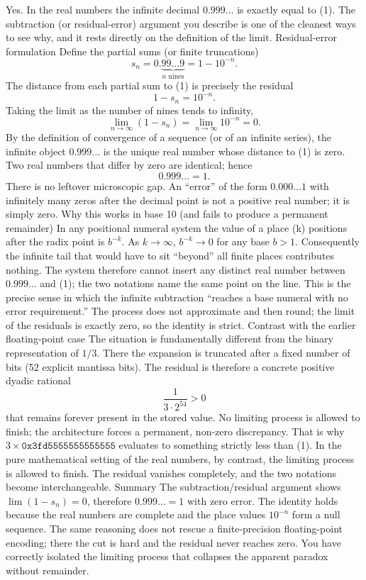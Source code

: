 Yes. In the real numbers the infinite decimal \(0.999\ldots\) is exactly equal to (1). The subtraction (or residual-error) argument you describe is one of the cleanest ways to see why, and it rests directly on the definition of the limit.
Residual-error formulation
Define the partial sums (or finite truncations)
\[
s_n = 0.\underbrace{99\ldots9}_{n\text{ nines}} = 1 - 10^{-n}.
\]
The distance from each partial sum to (1) is precisely the residual
\[
1 - s_n = 10^{-n}.
\]
Taking the limit as the number of nines tends to infinity,
\[
\lim_{n\to\infty}(1 - s_n) = \lim_{n\to\infty}10^{-n} = 0.
\]
By the definition of convergence of a sequence (or of an infinite series), the infinite object \(0.999\ldots\) is the unique real number whose distance to (1) is zero. Two real numbers that differ by zero are identical; hence
\[
0.999\ldots = 1.
\]
There is no leftover microscopic gap. An “error” of the form \(0.000\ldots1\) with infinitely many zeros after the decimal point is not a positive real number; it is simply zero.
Why this works in base 10 (and fails to produce a permanent remainder)
In any positional numeral system the value of a place (k) positions after the radix point is \(b^{-k}\). As \(k\to\infty\), \(b^{-k}\to 0\) for any base \(b>1\). Consequently the infinite tail that would have to sit “beyond” all finite places contributes nothing. The system therefore cannot insert any distinct real number between \(0.999\ldots\) and (1); the two notations name the same point on the line.
This is the precise sense in which the infinite subtraction “reaches a base numeral with no error requirement.” The process does not approximate and then round; the limit of the residuals is exactly zero, so the identity is strict.
Contrast with the earlier floating-point case
The situation is fundamentally different from the binary representation of \(1/3\). There the expansion is truncated after a fixed number of bits (52 explicit mantissa bits). The residual is therefore a concrete positive dyadic rational
\[
\frac{1}{3\cdot 2^{54}} > 0
\]
that remains forever present in the stored value. No limiting process is allowed to finish; the architecture forces a permanent, non-zero discrepancy. That is why \(3\times\texttt{0x3fd5555555555555}\) evaluates to something strictly less than (1).
In the pure mathematical setting of the real numbers, by contrast, the limiting process is allowed to finish. The residual vanishes completely, and the two notations become interchangeable.
Summary
The subtraction/residual argument shows \(\lim(1-s_n)=0\), therefore \(0.999\ldots=1\) with zero error.
The identity holds because the real numbers are complete and the place values \(10^{-n}\) form a null sequence.
The same reasoning does not rescue a finite-precision floating-point encoding; there the cut is hard and the residual never reaches zero.
You have correctly isolated the limiting process that collapses the apparent paradox without remainder.

